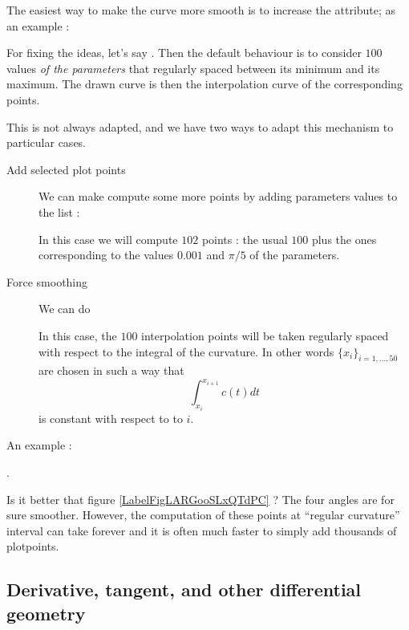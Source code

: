 The easiest way to make the curve more smooth is to increase the  attribute; as an example :



For fixing the ideas, let's say . Then the default behaviour is to consider \( 100\) values \emph{of the parameters} that regularly spaced between its minimum and its maximum. The drawn curve is then the interpolation curve of the corresponding points.

This is not always adapted, and we have two ways to adapt this mechanism to particular cases.
\begin{description}
    \item[Add selected plot points] We can make compute some more points by adding parameters values to the list  :
        
        In this case we will compute \( 102\) points : the usual \( 100\) plus the ones corresponding to the values \( 0.001 \) and \( \pi/5\) of the parameters.

    \item[Force smoothing]
            We can do
        
        In this case, the \( 100\) interpolation points will be taken regularly spaced with respect to the integral of the curvature. In other words \( \{ x_i \}_{i=1,\ldots, 50}\) are chosen in such a way that
        \begin{equation}
            \int_{x_i}^{x_{i+1}}c(t)dt
        \end{equation}
        is constant with respect to to \( i\).

\end{description}

An example :

.

\begin{center}
   
\end{center}
Is it better that figure \ref{LabelFigLARGooSLxQTdPC} ? The four angles are for sure smoother. However, the computation of these points at ``regular curvature'' interval can take forever and it is often much faster to simply add thousands of plotpoints.

\subsection{Derivative, tangent, and other differential geometry}

